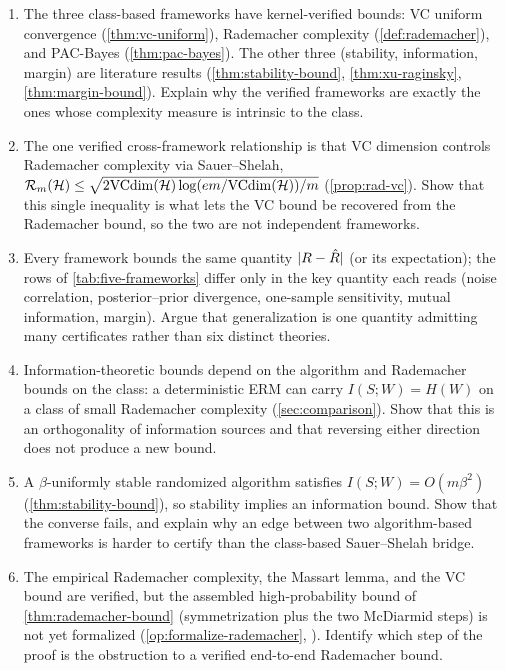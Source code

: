 \begin{enumerate}[leftmargin=*,itemsep=3pt]
\item The three class-based frameworks have kernel-verified bounds: VC uniform convergence (\cref{thm:vc-uniform}), Rademacher complexity (\cref{def:rademacher}), and PAC-Bayes (\cref{thm:pac-bayes}).  The other three (stability, information, margin) are literature results (\cref{thm:stability-bound}, \cref{thm:xu-raginsky}, \cref{thm:margin-bound}).  Explain why the verified frameworks are exactly the ones whose complexity measure is intrinsic to the class.

\item The one verified cross-framework relationship is that VC dimension controls Rademacher complexity via Sauer--Shelah, $\mathcal{R}_m(\mathcal{H}) \le \sqrt{2\mathrm{VCdim}(\mathcal{H})\log(em/\mathrm{VCdim}(\mathcal{H}))/m}$ (\cref{prop:rad-vc}).  Show that this single inequality is what lets the VC bound be recovered from the Rademacher bound, so the two are not independent frameworks.

\item Every framework bounds the same quantity $|R - \hat{R}|$ (or its expectation); the rows of \cref{tab:five-frameworks} differ only in the key quantity each reads (noise correlation, posterior--prior divergence, one-sample sensitivity, mutual information, margin).  Argue that generalization is one quantity admitting many certificates rather than six distinct theories.

\item Information-theoretic bounds depend on the algorithm and Rademacher bounds on the class: a deterministic ERM can carry $I(S;W)=H(W)$ on a class of small Rademacher complexity (\cref{sec:comparison}).  Show that this is an orthogonality of information sources and that reversing either direction does not produce a new bound.

\item A $\beta$-uniformly stable randomized algorithm satisfies $I(S;W)=O(m\beta^2)$ (\cref{thm:stability-bound}), so stability implies an information bound.  Show that the converse fails, and explain why an edge between two algorithm-based frameworks is harder to certify than the class-based Sauer--Shelah bridge.

\item The empirical Rademacher complexity, the Massart lemma, and the VC bound are verified, but the assembled high-probability bound of \cref{thm:rademacher-bound} (symmetrization plus the two McDiarmid steps) is not yet formalized (\cref{op:formalize-rademacher}, \cite{BartlettMendelson2002}).  Identify which step of the proof is the obstruction to a verified end-to-end Rademacher bound.


\end{enumerate}
